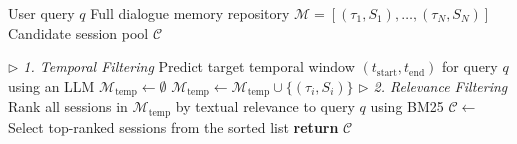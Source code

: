 \documentclass{article} %
\begin{document}
\newpage

\begin{algorithm}[t!]
\caption{Candidate Generation}
\label{alg:candidate_gen}
\begin{algorithmic}[1]
\Require
\Statex User query $q$
\Statex Full dialogue memory repository $\mathcal{M} = [(\tau_1, S_1), \dots, (\tau_N, S_N)]$
\Ensure
\Statex Candidate session pool $\mathcal{C}$

    \Statex \textit{\quad $\rhd$ 1. Temporal Filtering}
    \State Predict target temporal window $(t_{\text{start}}, t_{\text{end}})$ for query $q$ using an LLM
    \State $\mathcal{M}_{\text{temp}} \leftarrow \emptyset$
            \State $\mathcal{M}_{\text{temp}} \leftarrow \mathcal{M}_{\text{temp}} \cup \{(\tau_i, S_i)\}$
        \EndIf
    \EndFor
    \Statex \textit{\quad $\rhd$ 2. Relevance Filtering}
    \State Rank all sessions in $\mathcal{M}_{\text{temp}}$ by textual relevance to query $q$ using BM25
    \State $\mathcal{C} \leftarrow$ Select top-ranked sessions from the sorted list
    \State \textbf{return} $\mathcal{C}$
\EndFunction
\end{algorithmic}
\end{algorithm}
\end{document}
